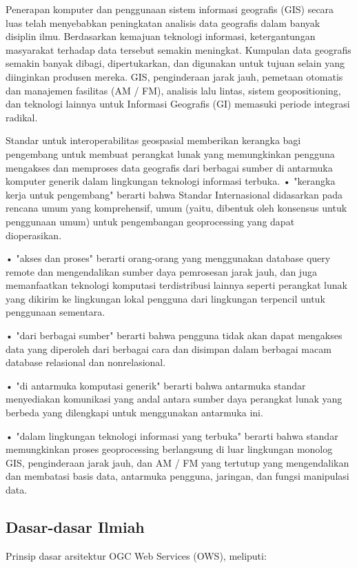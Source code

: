 Penerapan komputer dan penggunaan sistem informasi geografis (GIS) secara luas telah menyebabkan peningkatan analisis data geografis dalam banyak disiplin ilmu. Berdasarkan kemajuan teknologi informasi, ketergantungan masyarakat terhadap data tersebut semakin meningkat. Kumpulan data geografis semakin banyak dibagi, dipertukarkan, dan digunakan untuk tujuan
selain yang diinginkan produsen mereka. GIS, penginderaan jarak jauh, pemetaan otomatis dan manajemen fasilitas (AM / FM), analisis lalu lintas, sistem geopositioning, dan teknologi lainnya untuk Informasi Geografis (GI) memasuki periode integrasi radikal. 

Standar untuk interoperabilitas geospasial memberikan kerangka bagi pengembang untuk membuat perangkat lunak yang memungkinkan pengguna mengakses dan memproses data geografis dari berbagai sumber di antarmuka komputer generik dalam lingkungan teknologi informasi terbuka.
• "kerangka kerja untuk pengembang" berarti bahwa Standar Internasional didasarkan pada rencana umum yang komprehensif, umum (yaitu, dibentuk oleh konsensus untuk penggunaan umum) untuk pengembangan geoprocessing yang dapat dioperasikan.

• "akses dan proses" berarti orang-orang yang menggunakan database query remote dan mengendalikan sumber daya pemrosesan jarak jauh, dan juga memanfaatkan teknologi komputasi terdistribusi lainnya seperti perangkat lunak yang dikirim ke lingkungan lokal pengguna dari lingkungan terpencil untuk penggunaan sementara.

• "dari berbagai sumber" berarti bahwa pengguna tidak akan dapat mengakses data yang diperoleh dari berbagai cara dan disimpan dalam berbagai macam database relasional dan nonrelasional.

• "di antarmuka komputasi generik" berarti bahwa antarmuka standar menyediakan komunikasi yang andal antara sumber daya perangkat lunak yang berbeda yang dilengkapi untuk menggunakan antarmuka ini.

• "dalam lingkungan teknologi informasi yang terbuka" berarti bahwa standar memungkinkan proses geoprocessing berlangsung di luar lingkungan monolog GIS, penginderaan jarak jauh, dan AM / FM yang tertutup yang mengendalikan dan membatasi basis data, antarmuka pengguna, jaringan, dan fungsi manipulasi data.

\subsection{Dasar-dasar Ilmiah}
\cite{lupp2008open}Prinsip dasar arsitektur OGC Web Services (OWS), meliputi:

